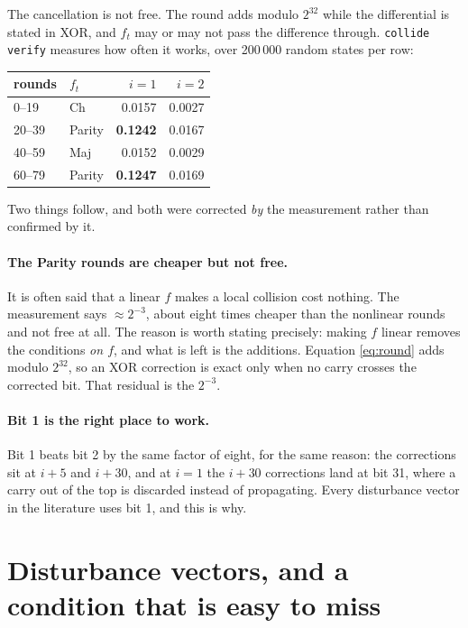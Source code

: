 \documentclass[11pt,a4paper]{article}
\begin{document}
The cancellation is not free. The round adds modulo $2^{32}$ while the
differential is stated in XOR, and $f_t$ may or may not pass the difference
through. \texttt{collide verify} measures how often it works, over 200\,000
random states per row:

\begin{center}
\begin{tabular}{llrr}
\toprule
rounds & $f_t$ & $i=1$ & $i=2$ \\
\midrule
0--19  & Ch     & 0.0157 & 0.0027 \\
20--39 & Parity & \textbf{0.1242} & 0.0167 \\
40--59 & Maj    & 0.0152 & 0.0029 \\
60--79 & Parity & \textbf{0.1247} & 0.0169 \\
\bottomrule
\end{tabular}
\end{center}

Two things follow, and both were corrected \emph{by} the measurement rather
than confirmed by it.

\paragraph{The Parity rounds are cheaper but not free.} It is often said that
a linear $f$ makes a local collision cost nothing. The measurement says
$\approx 2^{-3}$, about eight times cheaper than the nonlinear rounds and not
free at all. The reason is worth stating precisely: making $f$ linear removes
the conditions \emph{on $f$}, and what is left is the additions. Equation
\eqref{eq:round} adds modulo $2^{32}$, so an XOR correction is exact only when
no carry crosses the corrected bit. That residual is the $2^{-3}$.

\paragraph{Bit 1 is the right place to work.} Bit 1 beats bit 2 by the same
factor of eight, for the same reason: the corrections sit at $i+5$ and $i+30$,
and at $i=1$ the $i+30$ corrections land at bit 31, where a carry out of the
top is discarded instead of propagating. Every disturbance vector in the
literature uses bit 1, and this is why.

\section{Disturbance vectors, and a condition that is easy to miss}
\label{sec:dv}
\end{document}
